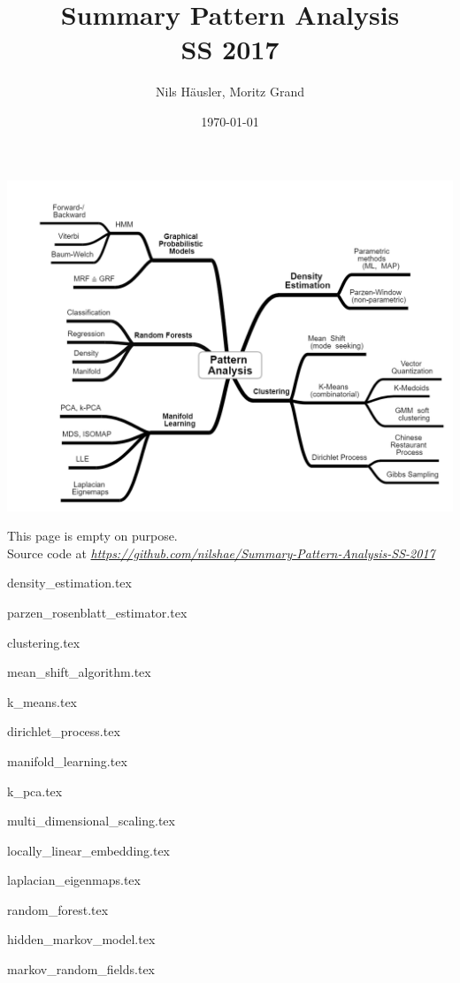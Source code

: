 \documentclass[12p]{article}
\title{Summary Pattern Analysis\\ SS 2017}
\author{Nils Häusler, Moritz Grand}
\date{\today}
\begin{document}
\begin{titlepage}
  \thispagestyle{empty}
  \maketitle
  \includegraphics[width=\textwidth]{overview.png}
\end{titlepage}

{\centering
	This page is empty on purpose.\\
  Source code at \emph{\href{https://github.com/nilshae/Summary-Pattern-Analysis-SS-2017}{https://github.com/nilshae/Summary-Pattern-Analysis-SS-2017}}\par
}

\newpage
{density_estimation.tex}

\newpage
{parzen_rosenblatt_estimator.tex}

\newpage
{clustering.tex}

\newpage
{mean_shift_algorithm.tex}

\newpage
{k_means.tex}

\newpage
{dirichlet_process.tex}

\newpage
{manifold_learning.tex}

\newpage
{k_pca.tex}

\newpage
{multi_dimensional_scaling.tex}

\newpage
{locally_linear_embedding.tex}

\newpage
{laplacian_eigenmaps.tex}

\newpage
{random_forest.tex}

\newpage
{hidden_markov_model.tex}

\newpage
{markov_random_fields.tex}
\end{document}
